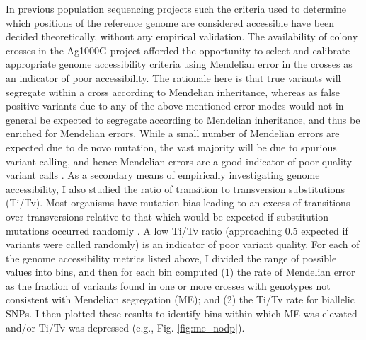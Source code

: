 \documentclass[a4paper,11pt,abstracton,hidelinks]{scrartcl}
\begin{document}
In previous population sequencing projects such \citet{1000G2015} the criteria used to determine which positions of the reference genome are considered accessible have been decided theoretically, without any empirical validation.
%
The availability of colony crosses in the Ag1000G project afforded the opportunity to select and calibrate appropriate genome accessibility criteria using Mendelian error in the crosses as an indicator of poor accessibility.
%
The rationale here is that true variants will segregate within a cross according to Mendelian inheritance, whereas as false positive variants due to any of the above mentioned error modes would not in general be expected to segregate according to Mendelian inheritance, and thus be enriched for Mendelian errors.
%
While a small number of Mendelian errors are expected due to de novo mutation, the vast majority will be due to spurious variant calling, and hence Mendelian errors are a good indicator of poor quality variant calls \citep{Saunders2007,Laurie2010,Pilipenko2014}.
%
As a secondary means of empirically investigating genome accessibility, I also studied the ratio of transition to transversion substitutions (Ti/Tv).
%
Most organisms have mutation bias leading to an excess of transitions over transversions relative to that which would be expected if substitution mutations occurred randomly \citep{Guo2013}. 
%
A low Ti/Tv ratio (approaching 0.5 expected if variants were called randomly) is an indicator of poor variant quality.
%
For each of the genome accessibility metrics listed above, I divided the range of possible values into bins, and then for each bin computed (1) the rate of Mendelian error as the fraction of variants found in one or more crosses with genotypes not consistent with Mendelian segregation (ME); and (2) the Ti/Tv rate for biallelic SNPs.
%
I then plotted these results to identify bins within which ME was elevated and/or Ti/Tv was depressed (e.g., Fig. \ref{fig:me_nodp}).
\end{document}

